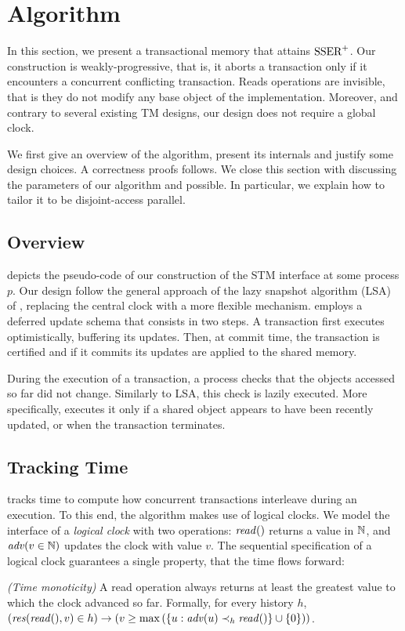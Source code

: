\section{Algorithm}

In this section, we present a transactional memory that attains $\SPSER$.
Our construction is weakly-progressive, that is, it aborts a transaction only if it encounters a concurrent conflicting transaction.
Reads operations are invisible, that is they do not modify any base object of the implementation.
Moreover, and contrary to several existing TM designs, our design does not require a global clock.

We first give an overview of the algorithm, present its internals and justify some design choices.
A correctness proofs follows.
We close this section with discussing the parameters of our algorithm and possible.
In particular, we explain how to tailor it to be disjoint-access parallel.

\subsection{Overview}

 depicts the pseudo-code of our construction of the STM interface at some process $p$.
Our design follow the general approach of the lazy snapshot algorithm (LSA) of \citet{FelberFMR10}, replacing the central clock with a more flexible mechanism.
 employs a deferred update schema that consists in two steps.
A transaction first executes optimistically, buffering its updates.
Then, at commit time, the transaction is certified and if it commits its updates are applied to the shared memory.

During the execution of a transaction, a process checks that the objects accessed so far did not change.
Similarly to LSA, this check is lazily executed.
More specifically,  executes it only if a shared object appears to have been recently updated, or when the transaction terminates.

\subsection{Tracking Time}

 tracks time to compute how concurrent transactions interleave during an execution.
To this end, the algorithm makes use of logical clocks.
We model the interface of a \emph{logical clock} with two operations: $\cread$ returns a value in $\naturalSet$, and $\cadv(v \in \naturalSet)$ updates the clock with value $v$.
The sequential specification of a logical clock guarantees a single property, that the time flows forward:
\begin{inparaenum}
\item[\emph{(Time monoticity)}]
  A read operation always returns at least the greatest value to which the clock advanced so far.
  Formally, for every history $h$, $(\responseAny{\cread}{v} \in h) \implies (v \geq \max{(\{u : \cadv(u) \hb_h \cread \} \union \{0\})})$.
\end{inparaenum}

